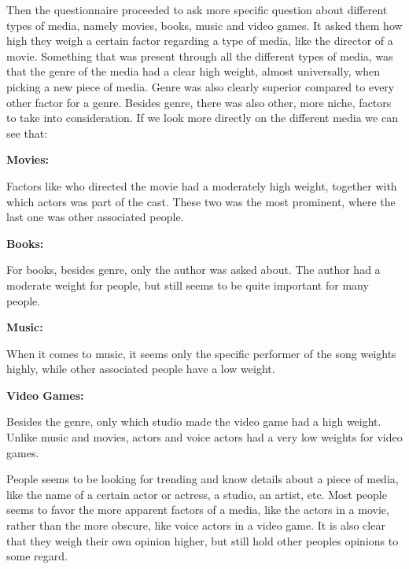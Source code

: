 Then the questionnaire proceeded to ask more specific question about different types of media, namely movies, books, music and video games. It asked them how high they weigh a certain factor regarding a type of media, like the director of a movie. Something that was present through all the different types of media, was that the genre of the media had a clear high weight, almost universally, when picking a new piece of media. Genre was also clearly superior compared to every other factor for a genre. Besides genre, there was also other, more niche, factors to take into consideration.
If we look more directly on the different media we can see that:

\textbf{Movies:}

Factors like who directed the movie had a moderately high weight, together with which actors was part of the cast. These two was the most prominent, where the last one was other associated people.

\textbf{Books:}

For books, besides genre, only the author was asked about. The author had a moderate weight for people, but still seems to be quite important for many people.

\textbf{Music:}

When it comes to music, it seems only the specific performer of the song weights highly, while other associated people have a low weight.

\textbf{Video Games:}

Besides the genre, only which studio made the video game had a high weight. Unlike music and movies, actors and voice actors had a very low weights for video games.

People seems to be looking for trending and know details about a piece of media, like the name of a certain actor or actress, a studio, an artist, etc. Most people seems to favor the more apparent factors of a media, like the actors in a movie, rather than the more obscure, like voice actors in a video game. It is also clear that they weigh their own opinion higher, but still hold other peoples opinions to some regard.